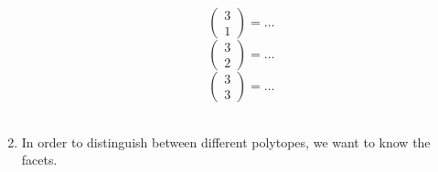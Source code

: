 \documentclass[10pt]{article}
\begin{document}
\begin{enumerate}
	$$\begin{pmatrix} 3 \\1\end{pmatrix} =  \dots $$
	$$\begin{pmatrix} 3 \\2\end{pmatrix} =  \dots $$
	$$\begin{pmatrix} 3 \\3\end{pmatrix} =  \dots $$\\

\item In order to distinguish between different polytopes, we want to know the facets.
\end{enumerate}
\end{document}
